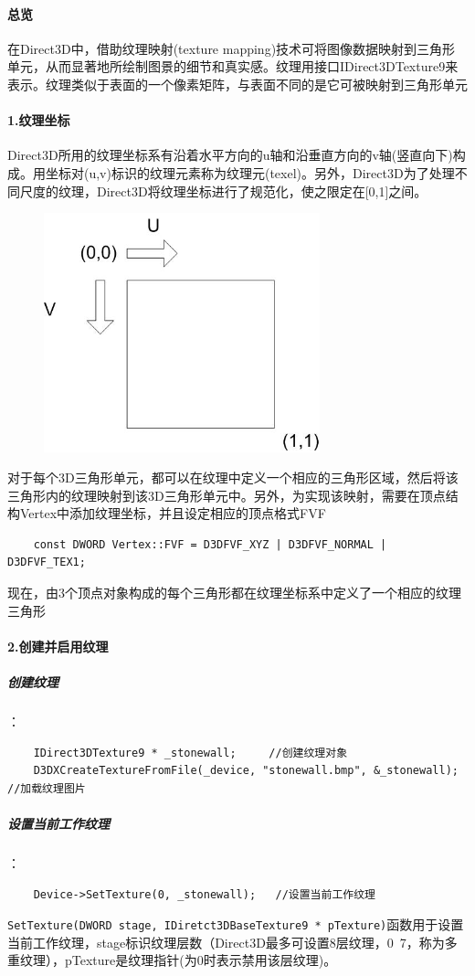 \documentclass[UTF8,a4paper,8pt]{ctexart}
\begin{document}
	\paragraph{总览}
		 在Direct3D中，借助纹理映射(texture mapping)技术可将图像数据映射到三角形单元，从而显著地所绘制图景的细节和真实感。纹理用接口IDirect3DTexture9来表示。纹理类似于表面的一个像素矩阵，与表面不同的是它可被映射到三角形单元
		 
	\paragraph{1.纹理坐标}
		Direct3D所用的纹理坐标系有沿着水平方向的u轴和沿垂直方向的v轴(竖直向下)构成。用坐标对(u,v)标识的纹理元素称为纹理元(texel)。另外，Direct3D为了处理不同尺度的纹理，Direct3D将纹理坐标进行了规范化，使之限定在[0,1]之间。
		
			\begin{figure}[h]
				\centering
				\includegraphics[width = 8cm]{TexturePoints.jpg}
			\end{figure}
		
		 对于每个3D三角形单元，都可以在纹理中定义一个相应的三角形区域，然后将该三角形内的纹理映射到该3D三角形单元中。另外，为实现该映射，需要在顶点结构Vertex中添加纹理坐标，并且设定相应的顶点格式FVF
		 \begin{lstlisting}
	const DWORD Vertex::FVF = D3DFVF_XYZ | D3DFVF_NORMAL | D3DFVF_TEX1; 
		 \end{lstlisting}
		 现在，由3个顶点对象构成的每个三角形都在纹理坐标系中定义了一个相应的纹理三角形
	
	\paragraph{2.创建并启用纹理}
			\subparagraph{创建纹理}：
				 \begin{lstlisting}
	IDirect3DTexture9 * _stonewall;     //创建纹理对象  
	D3DXCreateTextureFromFile(_device, "stonewall.bmp", &_stonewall);   //加载纹理图片 				  
				 \end{lstlisting}
			\subparagraph{设置当前工作纹理}：
				 \begin{lstlisting}
	Device->SetTexture(0, _stonewall);   //设置当前工作纹理  				  
				 \end{lstlisting}
				 \verb|SetTexture(DWORD stage, IDiretct3DBaseTexture9 * pTexture)|函数用于设置当前工作纹理，stage标识纹理层数（Direct3D最多可设置8层纹理，0~7，称为多重纹理），pTexture是纹理指针(为0时表示禁用该层纹理)。
				 
\end{document}
